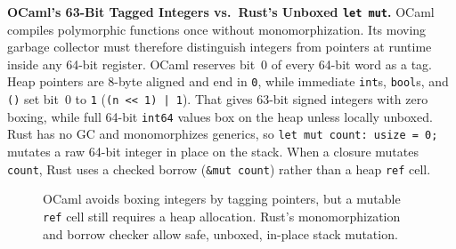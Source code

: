 \begin{happeningbox}
\textbf{OCaml's 63-Bit Tagged Integers vs.\ Rust's Unboxed \texttt{let mut}.}
OCaml compiles polymorphic functions once without monomorphization. Its moving garbage collector must therefore distinguish integers from pointers at runtime inside any 64-bit register. OCaml reserves bit~0 of every 64-bit word as a tag. Heap pointers are 8-byte aligned and end in \texttt{0}, while immediate \texttt{int}s, \texttt{bool}s, and \texttt{()} set bit~0 to \texttt{1} (\texttt{(n << 1) | 1}). That gives 63-bit signed integers with zero boxing, while full 64-bit \texttt{int64} values box on the heap unless locally unboxed. Rust has no GC and monomorphizes generics, so \texttt{let mut count: usize = 0;} mutates a raw 64-bit integer in place on the stack. When a closure mutates \texttt{count}, Rust uses a checked borrow (\texttt{\&mut count}) rather than a heap \texttt{ref} cell.
\end{happeningbox}


\begin{figure}[H]
\centering
{}
\caption{OCaml avoids boxing integers by tagging pointers, but a mutable \texttt{ref} cell still requires a heap allocation. Rust's monomorphization and borrow checker allow safe, unboxed, in-place stack mutation.}
\label{ch07:fig-ref-vs-mut}
\end{figure}


